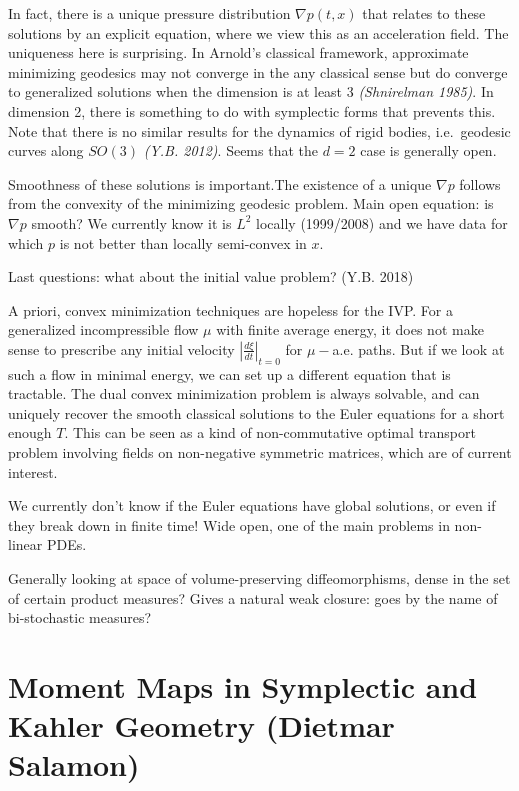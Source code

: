 In fact, there is a unique pressure distribution \(\nabla p(t, x)\) that
relates to these solutions by an explicit equation, where we view this
as an acceleration field. The uniqueness here is surprising. In Arnold's
classical framework, approximate minimizing geodesics may not converge
in the any classical sense but do converge to generalized solutions when
the dimension is at least 3 \emph{(Shnirelman 1985)}. In dimension 2,
there is something to do with symplectic forms that prevents this. Note
that there is no similar results for the dynamics of rigid bodies,
i.e.~geodesic curves along \(SO(3)\) \emph{(Y.B. 2012)}. Seems that the
\(d=2\) case is generally open.

Smoothness of these solutions is important.The existence of a unique
\(\nabla p\) follows from the convexity of the minimizing geodesic
problem. Main open equation: is \(\nabla p\) smooth? We currently know
it is \(L^2\) locally (1999/2008) and we have data for which \(p\) is
not better than locally semi-convex in \(x\).

Last questions: what about the initial value problem? (Y.B. 2018)

A priori, convex minimization techniques are hopeless for the IVP. For a
generalized incompressible flow \(\mu\) with finite average energy, it
does not make sense to prescribe any initial velocity
\(\left| \frac{d\xi}{dt}\right|_{t=0}\) for \(\mu-\)a.e. paths. But if
we look at such a flow in minimal energy, we can set up a different
equation that is tractable. The dual convex minimization problem is
always solvable, and can uniquely recover the smooth classical solutions
to the Euler equations for a short enough \(T\). This can be seen as a
kind of non-commutative optimal transport problem involving fields on
non-negative symmetric matrices, which are of current interest.

We currently don't know if the Euler equations have global solutions, or
even if they break down in finite time! Wide open, one of the main
problems in non-linear PDEs.

Generally looking at space of volume-preserving diffeomorphisms, dense
in the set of certain product measures? Gives a natural weak closure:
goes by the name of bi-stochastic measures?

\hypertarget{moment-maps-in-symplectic-and-kahler-geometry-dietmar-salamon}{%
\section{Moment Maps in Symplectic and Kahler Geometry (Dietmar
Salamon)}\label{moment-maps-in-symplectic-and-kahler-geometry-dietmar-salamon}}

